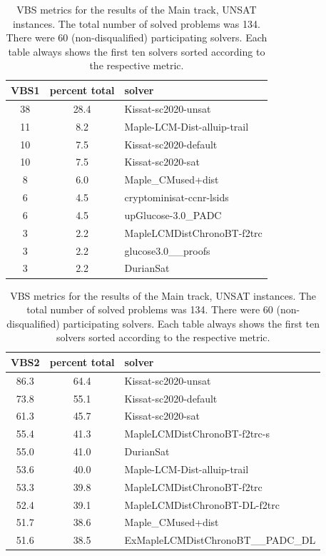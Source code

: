 \documentclass{elsarticle}
\begin{document}
\begin{table}
\caption{VBS metrics for the results of the Main track, UNSAT instances. 
The total number of solved problems was 134. 
There were 60 (non-disqualified) participating solvers.
Each table always shows the first ten solvers sorted according to the respective metric.}
\label{tab:vbsMainUNSAT}
\begin{center}
\begin{tabular}{ccl}
VBS1 & percent total & solver \\
\hline
38 & 28.4 & Kissat-sc2020-unsat \\
11 & \phantom{0}8.2 & Maple-LCM-Dist-alluip-trail \\
10 & \phantom{0}7.5 & Kissat-sc2020-default \\
10 & \phantom{0}7.5 & Kissat-sc2020-sat \\
\phantom{0}8 & \phantom{0}6.0 & Maple\_CMused+dist \\
\phantom{0}6 & \phantom{0}4.5 & cryptominisat-ccnr-lsids \\
\phantom{0}6 & \phantom{0}4.5 & upGlucose-3.0\_PADC \\
\phantom{0}3 & \phantom{0}2.2 & MapleLCMDistChronoBT-f2trc \\
\phantom{0}3 & \phantom{0}2.2 & glucose3.0\_\_proofs \\
\phantom{0}3 & \phantom{0}2.2 & DurianSat \\
\end{tabular}
\end{center}
\begin{center}
\begin{tabular}{ccl}
VBS2 & percent total & solver \\
\hline
86.3 & 64.4 & Kissat-sc2020-unsat \\
73.8 & 55.1 & Kissat-sc2020-default \\
61.3 & 45.7 & Kissat-sc2020-sat \\
55.4 & 41.3 & MapleLCMDistChronoBT-f2trc-s \\
55.0 & 41.0 & DurianSat \\
53.6 & 40.0 & Maple-LCM-Dist-alluip-trail \\
53.3 & 39.8 & MapleLCMDistChronoBT-f2trc \\
52.4 & 39.1 & MapleLCMDistChronoBT-DL-f2trc \\
51.7 & 38.6 & Maple\_CMused+dist \\
51.6 & 38.5 & ExMapleLCMDistChronoBT\_\_PADC\_DL \\
\end{tabular}

\end{center}
\end{table}
\end{document}
